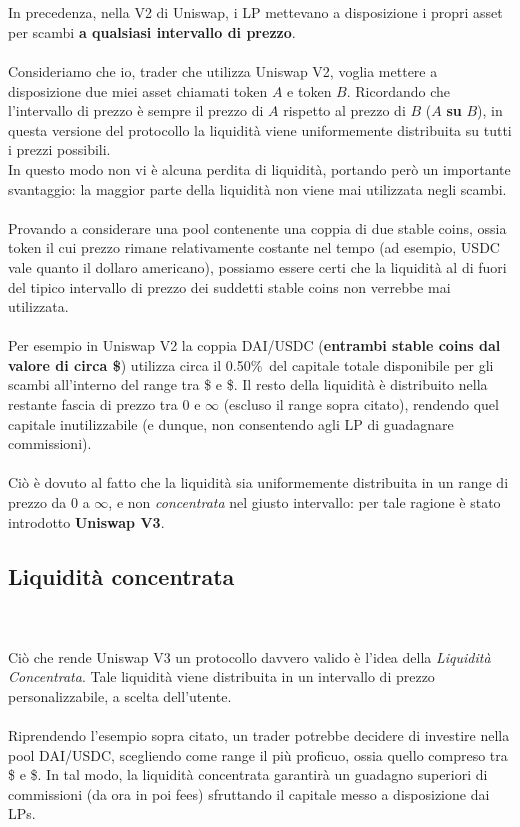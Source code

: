 \documentclass[12pt,a4paper]{report}
\begin{document}
\\\\In precedenza, nella V2 di Uniswap, i LP mettevano a disposizione i propri asset per scambi \textbf{a qualsiasi intervallo di prezzo}.
\\\\Consideriamo che io, trader che utilizza Uniswap V2, voglia mettere a disposizione due miei asset chiamati token $A$ e token $B$.
Ricordando che l'intervallo di prezzo è sempre il prezzo di $A$ rispetto al prezzo di $B$ ($A$ \textbf{su} $B$), in questa versione del protocollo la liquidità viene uniformemente distribuita su tutti i prezzi possibili.
\\In questo modo non vi è alcuna perdita di liquidità, portando però un importante svantaggio: la maggior parte della liquidità non viene mai utilizzata negli scambi.
\\\\Provando a considerare una pool contenente una coppia di due stable coins, ossia token il cui prezzo rimane relativamente costante nel tempo (ad esempio, USDC vale quanto il dollaro americano), possiamo essere certi che la liquidità al di fuori del tipico intervallo di prezzo dei suddetti stable coins non verrebbe mai utilizzata.
\\\\Per esempio in Uniswap V2 la coppia DAI/USDC (\textbf{entrambi stable coins dal valore di circa \$}) utilizza circa il 0.50\%\ del capitale totale disponibile per gli scambi all'interno del range tra \$ e \$\cite{v2_waste}. Il resto della liquidità è distribuito nella restante fascia di prezzo tra 0 e $\infty$ (escluso il range sopra citato), rendendo quel capitale inutilizzabile (e dunque, non consentendo agli LP di guadagnare commissioni). 
\\\\Ciò è dovuto al fatto che la liquidità sia uniformemente distribuita in un range di prezzo da 0 a $\infty$, e non \textit{concentrata} nel giusto intervallo: per tale ragione è stato introdotto \textbf{Uniswap V3}.

\subsection{Liquidità concentrata}
\\\\Ciò che rende Uniswap V3 un protocollo davvero valido è l'idea della \textit{Liquidità Concentrata}\cite{concentrated_liquidity}. Tale liquidità viene distribuita in un intervallo di prezzo personalizzabile, a scelta dell'utente.
\\\\Riprendendo l'esempio sopra citato, un trader potrebbe decidere di investire nella pool DAI/USDC, scegliendo come range il più proficuo, ossia quello compreso tra \$ e \$.
In tal modo, la liquidità concentrata garantirà un guadagno superiori di commissioni (da ora in poi fees) sfruttando il capitale messo a disposizione dai LPs.
\end{document}
